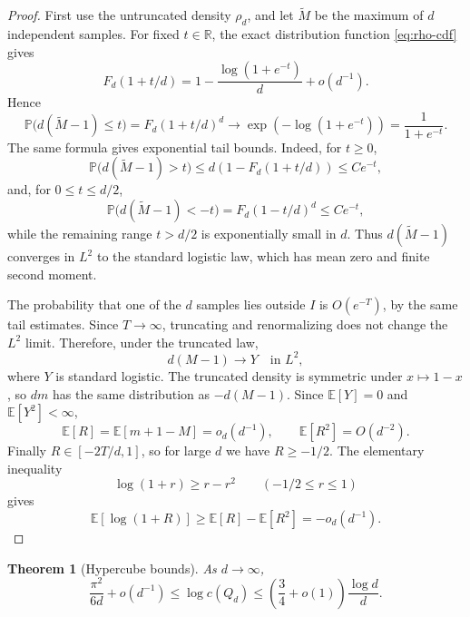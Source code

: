 \documentclass[11pt]{article}
\newtheorem{theorem}{Theorem}[section]
\theoremstyle{definition}
\newcommand{\RR}{\mathbb{R}}
\newcommand{\PP}{\mathbb{P}}
\newcommand{\EE}{\mathbb{E}}
\begin{document}
\smallskip
\noindent
\begin{proof}
First use the untruncated density $\rho_d$, and let $\widetilde M$ be the maximum of $d$ independent samples.  For fixed $t\in\RR$, the exact distribution function \eqref{eq:rho-cdf} gives
\[
  F_d(1+t/d)
  =1-\frac{\log(1+e^{-t})}{d}+o(d^{-1}).
\]
Hence
\[
  \PP\bigl(d(\widetilde M-1)\le t\bigr)
  =F_d(1+t/d)^d
  \longrightarrow
  \exp(-\log(1+e^{-t}))
  =\frac1{1+e^{-t}}.
\]
The same formula gives exponential tail bounds.  Indeed, for $t\ge0$,
\[
  \PP\bigl(d(\widetilde M-1)>t\bigr)
  \le d\left(1-F_d(1+t/d)\right)
  \le C e^{-t},
\]
and, for $0\le t\le d/2$,
\[
  \PP\bigl(d(\widetilde M-1)<-t\bigr)
  =F_d(1-t/d)^d
  \le C e^{-t},
\]
while the remaining range $t>d/2$ is exponentially small in $d$.  Thus $d(\widetilde M-1)$ converges in $L^2$ to the standard logistic law, which has mean zero and finite second moment.

\bigskip
\noindent
The probability that one of the $d$ samples lies outside $I$ is $O(e^{-T})$, by the same tail estimates.  Since $T\to\infty$, truncating and renormalizing does not change the $L^2$ limit.  Therefore, under the truncated law,
\[
  d(M-1)\to Y\quad\text{in }L^2,
\]
where $Y$ is standard logistic.  The truncated density is symmetric under $x\mapsto 1-x$, so $dm$ has the same distribution as $-d(M-1)$.  Since $\EE \left[Y\right]=0$ and $\EE \left[Y^2\right]<\infty$,
\[
  \EE \left[R\right]=\EE\left[m+1-M\right]=o_d(d^{-1}),
  \qquad
  \EE \left[R^2\right]=O(d^{-2}).
\]
Finally $R\in[-2T/d,1]$, so for large $d$ we have $R\ge-1/2$.  The elementary inequality
\[
  \log(1+r)\ge r-r^2\qquad(-1/2\le r\le1)
\]
gives
\[
  \EE\left[\log(1+R)\right]\ge \EE \left[R\right]-\EE \left[R^2\right]=-o_d(d^{-1}).
\]
\end{proof}

\begin{theorem}[Hypercube bounds]\label{thm:hypercube}
As $d\to\infty$,
\[
  \frac{\pi^2}{6d}+o(d^{-1})\le \log c(Q_d)
  \le \left(\frac34+o(1)\right)\frac{\log d}{d}.
\]
\end{theorem}
\end{document}
